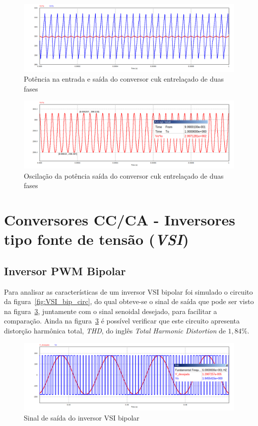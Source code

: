 \documentclass[
	12pt,				%
	openright,			%
	onseside,
	a4paper,			%
	english,			%
	french,				%
	spanish,			%
	brazil,				%
	]{abntex2}
\begin{document}
\begin{figure}[htbp]%
	\captionsetup{justification=centering}
	\centering
		\includegraphics[width=0.8 \linewidth]{cuk_inter_power_sign}
		\caption{Potência na entrada e saída do conversor cuk entrelaçado de duas fases}
		\label{fig:cuk_inter_power_sign}
\end{figure}

\begin{figure}[htbp]%
	\captionsetup{justification=centering}
	\centering
		\includegraphics[width=0.8 \linewidth]{cuk_inter_pow_out}
		\caption{Oscilação da potência saída do conversor cuk entrelaçado de duas fases}
		\label{fig:cuk_inter_power_sign_out}
\end{figure}

\section{Conversores CC/CA - Inversores tipo fonte de tensão (\textit{VSI})}

\subsection{Inversor PWM Bipolar}

Para analisar as características de um inversor VSI bipolar foi simulado o circuito da figura~\ref{fig:VSI_bip_circ}, do qual obteve-se o sinal de saída que pode ser visto na figura~\ref{fig:response_vsi_bip}, juntamente com o sinal senoidal desejado, para facilitar a comparação. Ainda na figura~\ref{fig:response_vsi_bip} é possível verificar que este circuito apresenta distorção harmônica total, \emph{THD}, do inglês \textit{Total Harmonic Distortion} de $1,84\%$.

\begin{figure}[htbp]%
	\centering
		\includegraphics[width=0.8 \linewidth]{vsi_bip_out}
		\caption{Sinal de saída do inversor VSI bipolar}
		\label{fig:response_vsi_bip}
\end{figure}
\end{document}
